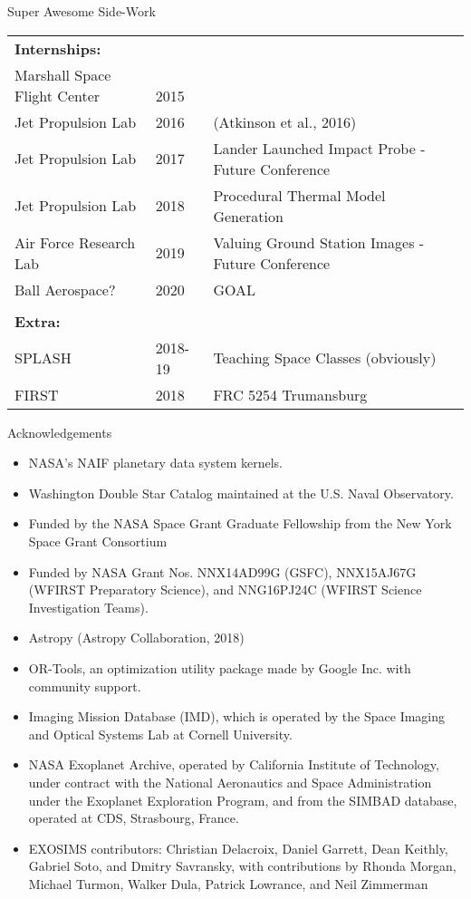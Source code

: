 \documentclass[aspectratio=169]{beamer}
\begin{document}
\begin{frame}{Super Awesome Side-Work}
\begin{flushleft}
\begin{tabular}{lll}
\textbf{Internships:} & & \\
\shortstack[l]{Marshall Space\\Flight Center} & \shortstack[l]{\\2015} & \\
Jet Propulsion Lab & 2016 & (Atkinson et al., 2016)\\
Jet Propulsion Lab & 2017 & Lander Launched Impact Probe - Future Conference\\
Jet Propulsion Lab & 2018 & Procedural Thermal Model Generation\\
Air Force Research Lab & 2019 & Valuing Ground Station Images - Future Conference\\
Ball Aerospace? & 2020 & GOAL \\
& & \\
\textbf{Extra:} & & \\
SPLASH & 2018-19 & Teaching Space Classes (obviously)\\
FIRST & 2018 & FRC 5254 Trumansburg
\end{tabular}
\end{flushleft}
\end{frame}

\begin{frame}{Acknowledgements}
\begin{itemize}
\item NASA's NAIF planetary data system kernels. %
\item Washington Double Star Catalog maintained at the U.S. Naval Observatory. %
\item Funded by the NASA Space Grant Graduate Fellowship from the New York Space Grant Consortium
\item Funded by NASA Grant Nos. NNX14AD99G (GSFC), NNX15AJ67G (WFIRST Preparatory Science), and NNG16PJ24C (WFIRST Science Investigation Teams).
\item Astropy (Astropy Collaboration, 2018)
\item OR-Tools, an optimization utility package made by Google Inc. with community support.
\item Imaging Mission Database (IMD), which is operated by the Space Imaging and Optical Systems Lab at Cornell University. 
\item NASA Exoplanet Archive, operated by California Institute of Technology, under contract with the National Aeronautics and Space Administration under the Exoplanet Exploration Program, and from the SIMBAD database, operated at CDS, Strasbourg, France.
\item EXOSIMS contributors: Christian Delacroix, Daniel Garrett, Dean Keithly, Gabriel Soto, and Dmitry Savransky, with contributions by Rhonda Morgan, Michael Turmon, Walker Dula, Patrick Lowrance, and Neil Zimmerman
\end{itemize}
\end{frame}
\end{document}
